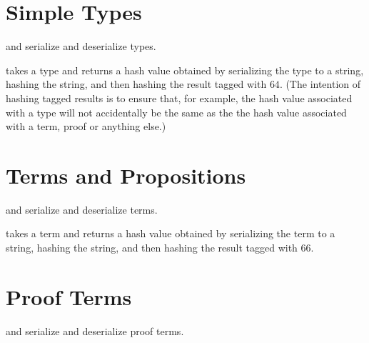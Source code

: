 \section{Simple Types}

{}

{} and {} serialize and deserialize types.

{} takes a type and returns a hash value obtained by serializing the type
to a string, hashing the string, and then hashing the result tagged with $64$.
(The intention of hashing tagged results is to ensure that, for example, the hash value
associated with a type will not accidentally be the same as the the hash value associated
with a term, proof or anything else.)

\section{Terms and Propositions}

{}

{} and {} serialize and deserialize terms.

{} takes a term and returns a hash value obtained by serializing the term
to a string, hashing the string, and then hashing the result tagged with $66$.

{}

\section{Proof Terms}

{}

{} and {} serialize and deserialize proof terms.

